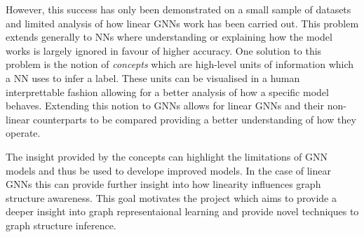 However, this success has only been demonstrated on a small sample of datasets and limited analysis of how linear GNNs work has been carried out.
This problem extends generally to NNs where understanding or explaining how the model works is largely ignored in favour of higher accuracy.
One solution to this problem is the notion of \emph{concepts} which are high-level units of information \cite{ghorbani2019towards} which a NN uses to infer a label.
These units can be visualised in a human interprettable fashion allowing for a better analysis of how a specific model behaves.
Extending this notion to GNNs\cite{magister2021gcexplainer,ying2019gnnexplainer} allows for linear GNNs and their non-linear counterparts to be compared providing a better understanding of how they operate.

The insight provided by the concepts can highlight the limitations of GNN models and thus be used to develope improved models.
In the case of linear GNNs this can provide further insight into how linearity influences graph structure awareness.
This goal motivates the project which aims to provide a deeper insight into graph representaional learning and provide novel techniques to graph structure inference.


